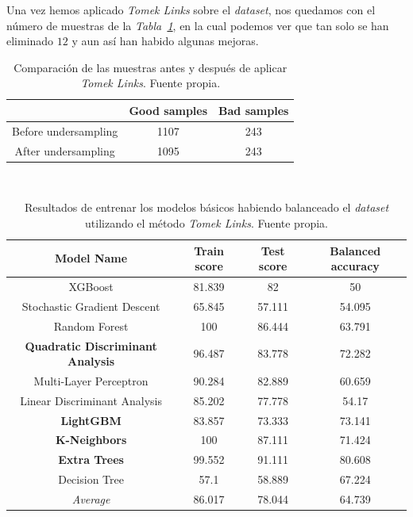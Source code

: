 Una vez hemos aplicado \textit{Tomek Links} sobre el \textit{dataset}, nos quedamos con el número de muestras de la \textit{Tabla\ \ref{tab:balance-tl-comparison}}, en la cual podemos ver que tan solo se han eliminado \textbf{$12$} y aun así han habido algunas mejoras.

\begin{table}[!h]
    \centering
    \begin{tabular}{|c|cc|} \hline
        & Good samples & Bad samples \\ \hline
        Before undersampling & 1107 & 243 \\
        After undersampling & 1095 & 243 \\ \hline
    \end{tabular}
    \caption{Comparación de las muestras antes y después de aplicar \textit{Tomek Links}. Fuente propia.}\ \label{tab:balance-tl-comparison}
\end{table}

\begin{table}[!h]
    \centering
    \begin{tabular}{|c|ccc|}
    \hline
        Model Name & Train score & Test score & Balanced accuracy \\ \hline
        XGBoost & 81.839 & 82 & 50 \\ 
        Stochastic Gradient Descent & 65.845 & 57.111 & 54.095 \\ 
        Random Forest & 100 & 86.444 & 63.791 \\ 
        \textbf{Quadratic Discriminant Analysis} & 96.487 & 83.778 & 72.282 \\ 
        Multi-Layer Perceptron & 90.284 & 82.889 & 60.659 \\ 
        Linear Discriminant Analysis & 85.202 & 77.778 & 54.17 \\ 
        \textbf{LightGBM} & 83.857 & 73.333 & 73.141 \\ 
        \textbf{K-Neighbors} & 100 & 87.111 & 71.424 \\ 
        \textbf{Extra Trees} & 99.552 & 91.111 & 80.608 \\ 
        Decision Tree & 57.1 & 58.889 & 67.224 \\ \hline
        \textit{Average} & 86.017 & 78.044 & 64.739 \\ \hline
    \end{tabular}
    \caption{Resultados de entrenar los modelos básicos habiendo balanceado el \textit{dataset} utilizando el método \textit{Tomek Links}. Fuente propia.}\ \label{tab:tomeklinks-basic-training}
\end{table}

